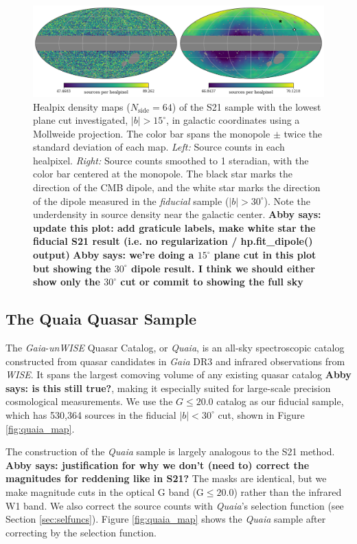 \documentclass[modern]{aastex631}
\newcommand{\abby}[1]{\textbf{Abby says: #1}}
\newcommand{\quaia}{\textsl{Quaia}\xspace}
\newcommand{\gaia}{\textsl{Gaia}\xspace}
\newcommand{\wise}{\textsl{WISE}\xspace}
\newcommand{\unwise}{\textsl{unWISE}\xspace}
\begin{document}
\begin{figure}
    \centering
    \includegraphics[width=\textwidth]{images/S21_map.png}
    \caption{Healpix density maps ($N_\mathrm{side}=64$) of the S21 sample with the lowest plane cut investigated, $|b|>15^\circ$, in galactic coordinates using a Mollweide projection. The color bar spans the monopole $\pm$ twice the standard deviation of each map. \textit{Left:} Source counts in each healpixel. \textit{Right:} Source counts smoothed to 1 steradian, with the color bar centered at the monopole. The black star marks the direction of the CMB dipole, and the white star marks the direction of the dipole measured in the \textit{fiducial} sample ($|b|>30^\circ$).
    Note the underdensity in source density near the galactic center. \abby{update this plot: add graticule labels, make white star the fiducial S21 result (i.e. no regularization / hp.fit\_dipole() output)}
    \abby{we're doing a $15^\circ$ plane cut in this plot but showing the $30^\circ$ dipole result. I think we should either show only the $30^\circ$ cut or commit to showing the full sky}}
    \label{fig:S21_map}
\end{figure}


\subsection{The Quaia Quasar Sample}
\label{sec:quaia}
The \gaia-\unwise Quasar Catalog, or \quaia, is an all-sky spectroscopic catalog constructed from quasar candidates in \gaia DR3 and infrared observations from \wise \citep{storey-fisher_quaia_2023}.
It spans the largest comoving volume of any existing quasar catalog \abby{is this still true?}, making it especially suited for large-scale precision cosmological measurements.
We use the $G\leq 20.0$ catalog as our fiducial sample, which has 530,364 sources in the fiducial $|b|<30^\circ$ cut, shown in Figure \ref{fig:quaia_map}.

The construction of the \quaia sample is largely analogous to the S21 method.
\abby{justification for why we don't (need to) correct the magnitudes for reddening like in S21?}
The masks are identical, but we make magnitude cuts in the optical G band ($\mathrm{G}\leq 20.0$) rather than the infrared W1 band.
We also correct the source counts with \quaia's selection function (see Section \ref{sec:selfuncs}).
Figure \ref{fig:quaia_map} shows the \quaia sample after correcting by the selection function.
\end{document}
